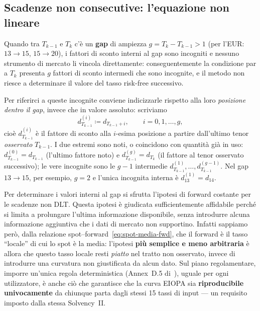 \documentclass[11pt,a4paper]{article}
\theoremstyle{plain}
\theoremstyle{definition}
\theoremstyle{remark}
\newcommand{\defeq}{\coloneqq}
\begin{document}
\subsection{Scadenze non consecutive: l'equazione non lineare}
\label{sec:nonlin}

Quando tra $T_{k-1}$ e $T_k$ c'\`e un \textbf{gap} di ampiezza $g=T_k-T_{k-1}>1$ (per l'EUR:
$13\!\to\!15$, $15\!\to\!20$), i fattori di sconto interni al gap sono incogniti e nessuno
strumento di mercato li vincola direttamente: conseguentemente la condizione par a $T_k$ presenta $g$ fattori di sconto intermedi che sono incognite, e il metodo non riesce a determinare il valore del tasso
risk-free successivo.

Per riferirci a queste incognite conviene indicizzarle rispetto alla loro \emph{posizione
dentro il gap}, invece che in valore assoluto: scriviamo
\begin{equation}
  \label{eq:notazione-gap}
  d^{(i)}_{T_{k-1}} \defeq d_{T_{k-1}+i},
  \qquad i = 0,1,\ldots,g,
\end{equation}
cio\`e $d^{(i)}_{T_{k-1}}$ \`e il fattore di sconto alla $i$-esima posizione a partire
dall'ultimo tenor \emph{osservato} $T_{k-1}$. I due estremi sono noti, o coincidono con
quantit\`a gi\`a in uso: $d^{(0)}_{T_{k-1}} = d_{T_{k-1}}$ (l'ultimo fattore noto) e
$d^{(g)}_{T_{k-1}} = d_{T_k}$ (il fattore al tenor osservato successivo); le vere incognite
sono le $g-1$ intermedie $d^{(1)}_{T_{k-1}},\ldots,d^{(g-1)}_{T_{k-1}}$. Nel gap
$13\!\to\!15$, per esempio, $g=2$ e l'unica incognita interna \`e $d^{(1)}_{13}=d_{14}$.

Per determinare i valori interni al gap si sfrutta l'ipotesi di forward costante per le
scadenze non DLT. Questa ipotesi \`e giudicata sufficientemente affidabile perch\'e si limita a
prolungare l'ultima informazione disponibile, senza introdurre alcuna informazione aggiuntiva che i dati di mercato non supportino. Infatti sappiamo per\`o, dalla relazione
spot--forward~\eqref{eq:spot-media-fwd}, che il forward \`e il tasso ``locale'' di cui lo
spot \`e la media: l'ipotesi \textbf{pi\`u semplice e meno arbitraria} \`e allora che questo
tasso locale resti \emph{piatto} nel tratto non osservato, invece di introdurre una curvatura
non giustificata da alcun dato. 
Sul piano
regolamentare, imporre un'unica regola deterministica (Annex~D.5 di~\cite{eiopa2026}), uguale
per ogni utilizzatore, \`e anche ci\`o che garantisce che la curva EIOPA sia
\textbf{riproducibile univocamente} da chiunque parta dagli stessi 15 tassi di input --- un
requisito imposto dalla stessa Solvency~II.
\end{document}
